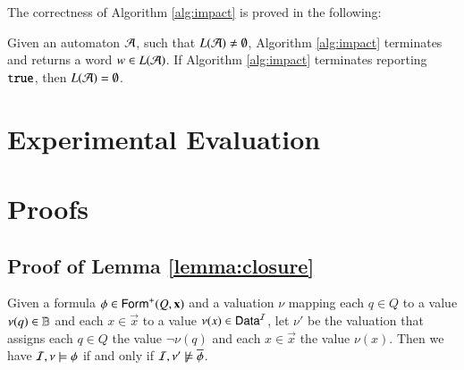 \documentclass[10pt,conference,letterpaper,twocolumn]{IEEEtran}
\begin{document}
The correctness of Algorithm \ref{alg:impact} is proved in the
following:

\begin{theorem}\label{thm:impact}
  Given an automaton $\mathcal{A}$, such that $L(\mathcal{A}) \neq \emptyset$, Algorithm
  \ref{alg:impact} terminates and returns a word $w \in L(\mathcal{A})$. If
  Algorithm \ref{alg:impact} terminates reporting $\mathtt{true}$, then
  $L(\mathcal{A}) = \emptyset$.
\end{theorem}

\section{Experimental Evaluation}

 

\appendix

\section{Proofs}

\subsection{Proof of Lemma \ref{lemma:closure}}

\begin{proposition}\label{prop:overline}
  Given a formula $\phi \in \mathsf{Form}^+(Q,\mathbf x)$ and a valuation $\nu$
  mapping each $q \in Q$ to a value $\nu(q) \in \mathbb{B}$ and each $x \in
  \vec{x}$ to a value $\nu(x) \in \mathsf{Data}^{\mathcal{I}}$, let $\nu'$ be the
  valuation that assigns each $q \in Q$ the value $\neg\nu(q)$ and
  each $x \in \vec{x}$ the value $\nu(x)$. Then we have 
  $\mathcal{I},\nu \models \phi$ if and only if $\mathcal{I},\nu' \not\models \overline{\phi}$. 
\end{proposition}
\end{document}

